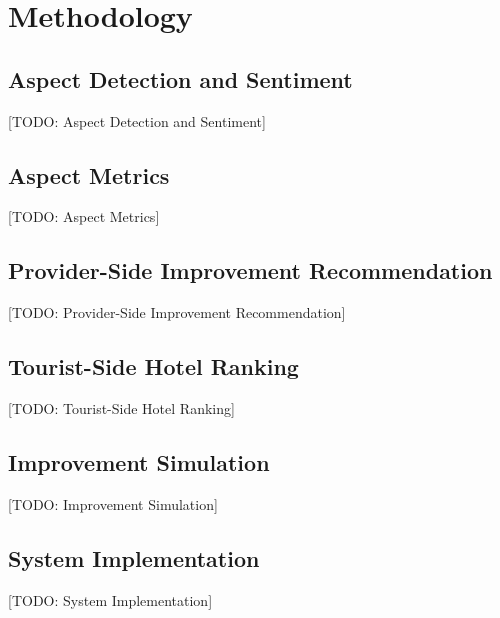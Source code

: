 \chapter{Methodology}
\section{Aspect Detection and Sentiment}
[TODO: Aspect Detection and Sentiment]

\section{Aspect Metrics}
[TODO: Aspect Metrics]

\section{Provider-Side Improvement Recommendation}
[TODO: Provider-Side Improvement Recommendation]

\section{Tourist-Side Hotel Ranking}
[TODO: Tourist-Side Hotel Ranking]

\section{Improvement Simulation}
[TODO: Improvement Simulation]

\section{System Implementation}
[TODO: System Implementation]
